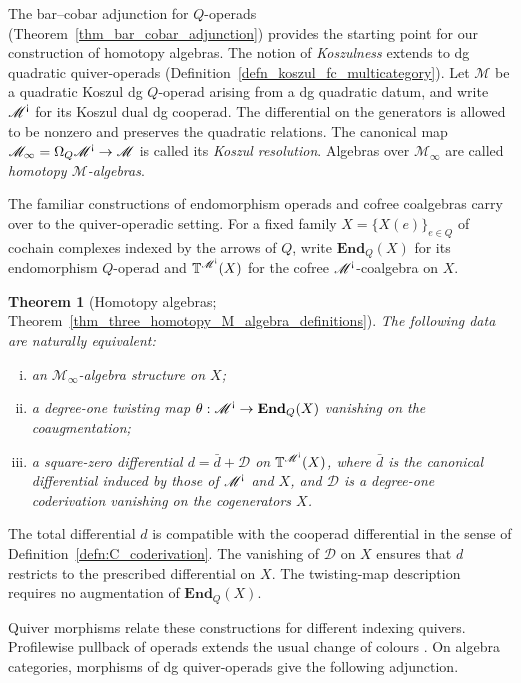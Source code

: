 \documentclass[11pt,letterpaper]{article}
\numberwithin{equation}{section}
\theoremstyle{plain}
\newcounter{mainthm}
\newtheorem{main}[mainthm]{Theorem}
\theoremstyle{definition}
\theoremstyle{remark}
\newcommand{\antishriek}{%
	\mathord{\mathchoice
		{\rotatebox[origin=c]{180}{$\displaystyle !$}}
		{\rotatebox[origin=c]{180}{$\textstyle !$}}
		{\rotatebox[origin=c]{180}{$\scriptstyle !$}}
		{\rotatebox[origin=c]{180}{$\scriptscriptstyle !$}}}}
\begin{document}
The bar--cobar adjunction for $Q$-operads (Theorem~\ref{thm_bar_cobar_adjunction}) provides the starting point for our construction of homotopy algebras. The notion of \textit{Koszulness} extends to dg quadratic quiver-operads (Definition~\ref{defn_koszul_fc_multicategory}). Let $\mathscr M$ be a quadratic Koszul dg $Q$-operad arising from a dg quadratic datum, and write $\mathscr M^{\antishriek}$ for its Koszul dual dg cooperad. The differential on the generators is allowed to be nonzero and preserves the quadratic relations. The canonical map $\mathscr M_\infty=\Omega_Q\mathscr M^{\antishriek}\to\mathscr M$ is called its \textit{Koszul resolution}. Algebras over $\mathscr M_\infty$ are called \textit{homotopy $\mathscr M$-algebras}.

The familiar constructions of endomorphism operads and cofree coalgebras carry over to the quiver-operadic setting. For a fixed family $X=\{X(e)\}_{e\in Q}$ of cochain complexes indexed by the arrows of $Q$, write $\mathbf{End}_Q(X)$ for its endomorphism $Q$-operad and $\mathbb T^{\mathscr M^{\antishriek}}(X)$ for the cofree $\mathscr M^{\antishriek}$-coalgebra on $X$.

\begin{main}[Homotopy algebras; Theorem~\ref{thm_three_homotopy_M_algebra_definitions}]
\label{thm_introduction_three_homotopy_M_algebra_definitions}
The following data are naturally equivalent:
\begin{enumerate}[(i)]
\itemsep 1pt
\item an $\mathscr M_\infty$-algebra structure on $X$;
\item a degree-one twisting map $\theta:\mathscr M^{\antishriek}\to\mathbf{End}_Q(X)$ vanishing on the coaugmentation;
\item a square-zero differential $d=\bar d+\mathcal D$ on $\mathbb T^{\mathscr M^{\antishriek}}(X)$, where $\bar d$ is the canonical differential induced by those of $\mathscr M^{\antishriek}$ and $X$, and $\mathcal D$ is a degree-one coderivation vanishing on the cogenerators $X$.
\end{enumerate}
\end{main}
The total differential $d$ is compatible with the cooperad differential in the sense of Definition~\ref{defn:C_coderivation}. The vanishing of $\mathcal D$ on $X$ ensures that $d$ restricts to the prescribed differential on $X$. The twisting-map description requires no augmentation of $\mathbf{End}_Q(X)$.

Quiver morphisms relate these constructions for different indexing
quivers. Profilewise pullback of operads extends the usual change of
colours \cite[\S~1.6]{BergerMoerdijkColoured}. On algebra categories,
morphisms of dg quiver-operads give the following adjunction.
\end{document}
